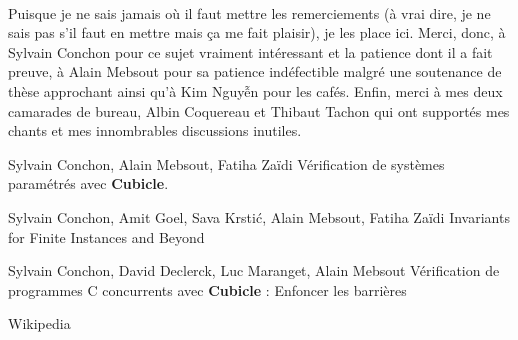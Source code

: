 \documentclass{memoir}
\begin{document}
	 	 \paragraph{} Puisque je ne sais jamais où il faut mettre les remerciements (à vrai dire, je ne sais pas s'il faut en mettre mais ça me fait plaisir), je les place ici. Merci, donc, à Sylvain Conchon pour ce sujet vraiment intéressant et la patience dont il a fait preuve, à Alain Mebsout pour sa patience indéfectible malgré une soutenance de thèse approchant ainsi qu'à Kim Nguy\~{\^{e}}n pour les cafés. Enfin, merci à mes deux camarades de bureau, Albin Coquereau et Thibaut Tachon qui ont supportés mes chants et mes innombrables discussions inutiles.

\begin{thebibliography}{10}

Sylvain Conchon, Alain Mebsout, Fatiha Zaïdi
\newline Vérification de systèmes paramétrés avec \textbf{Cubicle}.

Sylvain Conchon, Amit Goel, Sava Krsti\'{c}, Alain Mebsout, Fatiha Zaïdi
\newline Invariants for Finite Instances and Beyond

Sylvain Conchon, David Declerck, Luc Maranget, Alain Mebsout
\newline Vérification de programmes C concurrents avec \textbf{Cubicle} : Enfoncer les barrières

Wikipedia

\end{thebibliography}
\end{document}
